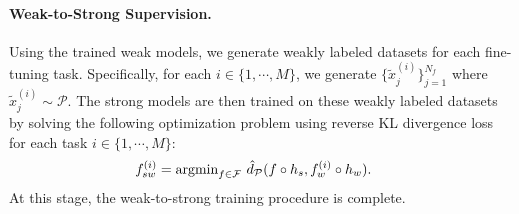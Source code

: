 \paragraph{Weak-to-Strong Supervision.} 
Using the trained weak models, we generate weakly labeled datasets for each fine-tuning task.
Specifically, for each $i \in \{ 1, \cdots, M \}$, we generate $\{\tilde{x}^{(i)}_j\}_{j=1}^{N_f}$ where $\tilde{x}^{(i)}_j \sim \mathcal{P}$. 
The strong models are then trained on these weakly labeled datasets by solving the following optimization problem using reverse KL divergence loss for each task $i \in \{ 1, \cdots, M \}$:
\begin{align}
    \label{eqn:weak-to-strong-supervision}
    f^{(i)}_{sw} &= \text{argmin}_{f \in \mathcal{F}} \ \hat{d}_\mathcal{P}(f \circ h_s, f^{(i)}_{w} \circ h_w). 
\end{align}
At this stage, the weak-to-strong training procedure is complete.










